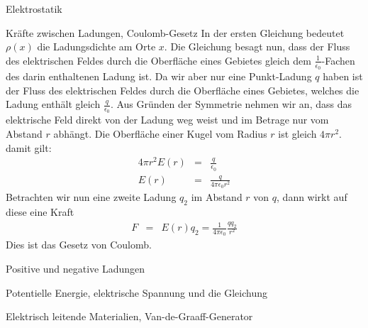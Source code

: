 \begin{chapter}{\titlestr}
\begin{section}{Elektrostatik}
\begin{subsection}{Kräfte zwischen Ladungen, Coulomb-Gesetz}
In der ersten Gleichung bedeutet $\rho(x)$ die Ladungsdichte am Orte $x$. Die Gleichung besagt nun, dass der Fluss des elektrischen Feldes durch die Oberfläche eines Gebietes gleich dem
$\frac{1}{\epsilon_0}$-Fachen des darin enthaltenen Ladung ist. Da wir aber nur eine Punkt-Ladung $q$ haben ist der Fluss des elektrischen Feldes durch die Oberfläche eines Gebietes, welches die Ladung enthält gleich $\frac{q}{\epsilon_0}$. Aus Gründen der Symmetrie nehmen wir an, dass das elektrische Feld direkt von der Ladung weg weist und im Betrage nur vom Abstand $r$ abhängt. Die Oberfläche einer Kugel vom Radius $r$ ist gleich $4\pi r^2$. damit gilt:
\begin{eqnarray*}
4\pi r^2 E(r) &=& \frac{q}{\epsilon_0}\\
E(r) &=& \frac{q}{4\pi\epsilon_0r^2}
\end{eqnarray*}
Betrachten wir nun eine zweite Ladung $q_2$ im Abstand $r$ von $q$, dann wirkt auf diese eine Kraft
\begin{eqnarray*}
F &=& E(r)q_2 = \frac{1}{4\pi\epsilon_0}\frac{qq_2}{r^2}
\end{eqnarray*}
Dies ist das Gesetz von Coulomb.
\end{subsection}

\begin{subsection}{Positive und negative Ladungen}
\end{subsection}

\begin{subsection}{Potentielle Energie, elektrische Spannung und die Gleichung }
\end{subsection}

\begin{subsection}{Elektrisch leitende Materialien, Van-de-Graaff-Generator}
\end{subsection}


\end{section}
\end{chapter}
